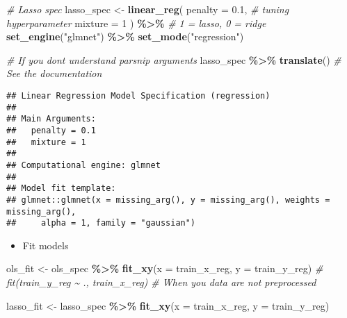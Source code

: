 \documentclass[
]{book}
\newenvironment{Shaded}{\begin{snugshade}}{\end{snugshade}}
\newcommand{\CommentTok}[1]{\textcolor[rgb]{0.56,0.35,0.01}{\textit{#1}}}
\newcommand{\DataTypeTok}[1]{\textcolor[rgb]{0.13,0.29,0.53}{#1}}
\newcommand{\DecValTok}[1]{\textcolor[rgb]{0.00,0.00,0.81}{#1}}
\newcommand{\FloatTok}[1]{\textcolor[rgb]{0.00,0.00,0.81}{#1}}
\newcommand{\KeywordTok}[1]{\textcolor[rgb]{0.13,0.29,0.53}{\textbf{#1}}}
\newcommand{\NormalTok}[1]{#1}
\newcommand{\OperatorTok}[1]{\textcolor[rgb]{0.81,0.36,0.00}{\textbf{#1}}}
\newcommand{\StringTok}[1]{\textcolor[rgb]{0.31,0.60,0.02}{#1}}
\providecommand{\tightlist}{%
  \setlength{\itemsep}{0pt}\setlength{\parskip}{0pt}}
\begin{document}
\begin{Shaded}
\begin{Highlighting}[]
\CommentTok{\# Lasso spec}
\NormalTok{lasso\_spec \textless{}{-}}\StringTok{ }\KeywordTok{linear\_reg}\NormalTok{(}
  \DataTypeTok{penalty =} \FloatTok{0.1}\NormalTok{, }\CommentTok{\# tuning hyperparameter}
  \DataTypeTok{mixture =} \DecValTok{1}
\NormalTok{) }\OperatorTok{\%\textgreater{}\%}\StringTok{ }\CommentTok{\# 1 = lasso, 0 = ridge}
\StringTok{  }\KeywordTok{set\_engine}\NormalTok{(}\StringTok{"glmnet"}\NormalTok{) }\OperatorTok{\%\textgreater{}\%}
\StringTok{  }\KeywordTok{set\_mode}\NormalTok{(}\StringTok{"regression"}\NormalTok{)}

\CommentTok{\# If you don\textquotesingle{}t understand parsnip arguments}
\NormalTok{lasso\_spec }\OperatorTok{\%\textgreater{}\%}\StringTok{ }\KeywordTok{translate}\NormalTok{() }\CommentTok{\# See the documentation}
\end{Highlighting}
\end{Shaded}

\begin{verbatim}
## Linear Regression Model Specification (regression)
## 
## Main Arguments:
##   penalty = 0.1
##   mixture = 1
## 
## Computational engine: glmnet 
## 
## Model fit template:
## glmnet::glmnet(x = missing_arg(), y = missing_arg(), weights = missing_arg(), 
##     alpha = 1, family = "gaussian")
\end{verbatim}

\begin{itemize}
\tightlist
\item
  Fit models
\end{itemize}

\begin{Shaded}
\begin{Highlighting}[]
\NormalTok{ols\_fit \textless{}{-}}\StringTok{ }\NormalTok{ols\_spec }\OperatorTok{\%\textgreater{}\%}
\StringTok{  }\KeywordTok{fit\_xy}\NormalTok{(}\DataTypeTok{x =}\NormalTok{ train\_x\_reg, }\DataTypeTok{y =}\NormalTok{ train\_y\_reg)}
\CommentTok{\# fit(train\_y\_reg \textasciitilde{} ., train\_x\_reg) \# When you data are not preprocessed}

\NormalTok{lasso\_fit \textless{}{-}}\StringTok{ }\NormalTok{lasso\_spec }\OperatorTok{\%\textgreater{}\%}
\StringTok{  }\KeywordTok{fit\_xy}\NormalTok{(}\DataTypeTok{x =}\NormalTok{ train\_x\_reg, }\DataTypeTok{y =}\NormalTok{ train\_y\_reg)}
\end{Highlighting}
\end{Shaded}
\end{document}
